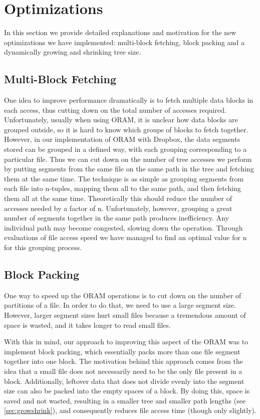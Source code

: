\documentclass[conference]{IEEEtran}
\begin{document}
\section{Optimizations}

In this section we provide detailed explanations and motivation for the new optimizations we have implemented: multi-block fetching, block packing and a dynamically growing and shrinking tree size.

\subsection{Multi-Block Fetching}

One idea to improve performance dramatically is to fetch multiple data blocks in each access, thus cutting down on the total number of accesses required. Unfortunately, usually when using ORAM, it is unclear how data blocks are grouped outside, so it is hard to know which groups of blocks to fetch together. However, in our implementation of ORAM with Dropbox, the data segments stored can be grouped in a defined way, with each grouping corresponding to a particular file. Thus we can cut down on the number of tree accesses we perform by putting segments from the same file on the same path in the tree and fetching them at the same time. The technique is as simple as grouping segments from each file into n-tuples, mapping them all to the same path, and then fetching them all at the same time. Theoretically this should reduce the number of accesses needed by a factor of n. Unfortunately, however, grouping a great number of segments together in the same path produces inefficiency. Any individual path may become congested, slowing down the operation. Through evaluations of file access speed we have managed to find an optimal value for n for this grouping process.

\subsection{Block Packing}

One way to speed up the ORAM operations is to cut down on the number of partitions of a file. In order to do that, we need to use a large segment size. However, larger segment sizes hurt small files because a tremendous amount of space is wasted, and it takes longer to read small files. 

With this in mind, our approach to improving this aspect of the ORAM was to implement block packing, which essentially packs more than one file segment together into one block. The motivation behind this approach comes from the idea that a small file does not necessarily need to be the only file present in a block. Additionally, leftover data that does not divide evenly into the segment size can also be packed into the empty spaces of a block. By doing this, space is saved and not wasted, resulting in a smaller tree and smaller path lengths (see \ref{sec:growshrink}), and consequently reduces file access time (though only slightly).
\end{document}
